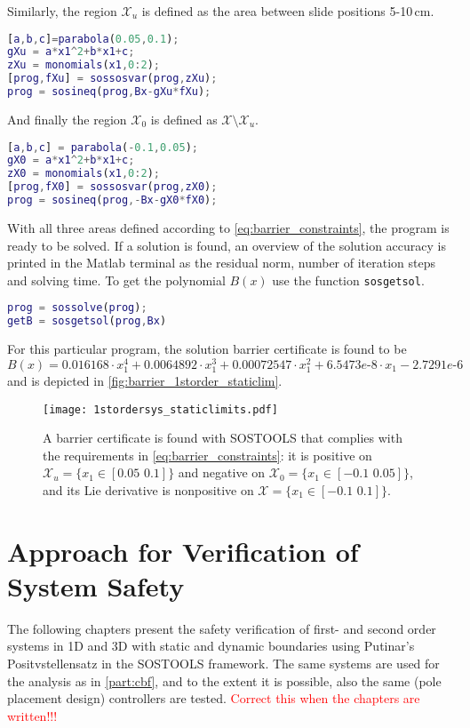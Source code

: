 Similarly, the region $\mathcal{X}_u$ is defined as the area between slide positions 5-10\,cm.
\begin{lstlisting}[language=matlab]
% Define space Xu in X
[a,b,c]=parabola(0.05,0.1);
gXu = a*x1^2+b*x1+c;
zXu = monomials(x1,0:2);
[prog,fXu] = sossosvar(prog,zXu);
prog = sosineq(prog,Bx-gXu*fXu);
\end{lstlisting}
And finally the region $\mathcal{X}_0$ is defined as $\mathcal{X}\setminus\mathcal{X}_u$.
\begin{lstlisting}[language=matlab]
% Define space X0 in X
[a,b,c] = parabola(-0.1,0.05);
gX0 = a*x1^2+b*x1+c;
zX0 = monomials(x1,0:2);
[prog,fX0] = sossosvar(prog,zX0);
prog = sosineq(prog,-Bx-gX0*fX0);
\end{lstlisting}
With all three areas defined according to \autoref{eq:barrier_constraints}, the program is ready to be solved. If a solution is found, an overview of the solution accuracy is printed in the Matlab terminal as the residual norm, number of iteration steps and solving time. To get the polynomial $B(x)$ use the function \verb|sosgetsol|.
\begin{lstlisting}[language=matlab]
% Solve for B
prog = sossolve(prog);
getB = sosgetsol(prog,Bx)
\end{lstlisting}
For this particular program, the solution barrier certificate is found to be
\begin{equation}
B(x) = 0.016168\cdot x_1^4 + 0.0064892\cdot x_1^3 + 0.00072547\cdot x_1^2 + 6.5473e\text{-}8\cdot x_1 - 2.7291e\text{-}6
\end{equation}
and is depicted in \autoref{fig:barrier_1storder_staticlim}.

\begin{figure}[htbp]
	\hspace*{-12mm}
	\texttt{[image: 1stordersys\_staticlimits.pdf]}
	\caption{A barrier certificate is found with SOSTOOLS that complies with the requirements in \autoref{eq:barrier_constraints}: it is positive on $\mathcal{X}_u=\{x_1\in [0.05\,\,0.1]\}$ and negative on $\mathcal{X}_0=\{x_1\in [-0.1\,\,0.05]\}$, and its Lie derivative is nonpositive on $\mathcal{X}=\{x_1\in [-0.1\,\,0.1]\}$.}
	\label{fig:barrier_1storder_staticlim}
\end{figure}

\section{Approach for Verification of System Safety}

The following chapters present the safety verification of first- and second order systems in 1D and 3D with static and dynamic boundaries using Putinar's Positvstellensatz in the SOSTOOLS framework. The same systems are used for the analysis as in \autoref{part:cbf}, and to the extent it is possible, also the same (pole placement design) controllers are tested. \textcolor{red}{Correct this when the chapters are written!!!}


